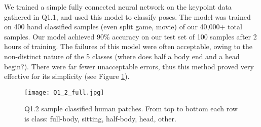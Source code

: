 We trained a simple fully connected neural network on the keypoint data gathered in Q1.1, and used this model to classify poses.
The model was trained on 400 hand classified samples (even split game, movie) of our 40,000+ total samples.
Our model achieved $90\%$ accuracy on our test set of 100 samples after 2 hours of training.
The failures of this model were often acceptable, owing to the non-distinct nature of the 5 classes (where does half a body end and a head begin?).
There were far fewer unacceptable errors, thus this method proved very effective for its simplicity (see Figure \ref{fig:Q1_2}).

\begin{figure}[h!]
  \begin{center}
  \texttt{[image: Q1\_2\_full.jpg]}
    \caption{Q1.2 sample classified human patches. From top to bottom each row is class: full-body, sitting, half-body, head, other.}
    \label{fig:Q1_2}
  \end{center}
  \end{figure}
